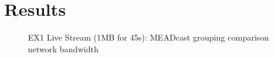 \chapter{Results} %
\label{chap:Results}

\begin{figure}
    \begin{center}
        
    \end{center}
    \caption{EX1 Live Stream (1MB for 45s): MEADcast grouping comparison network bandwidth}
\end{figure}

